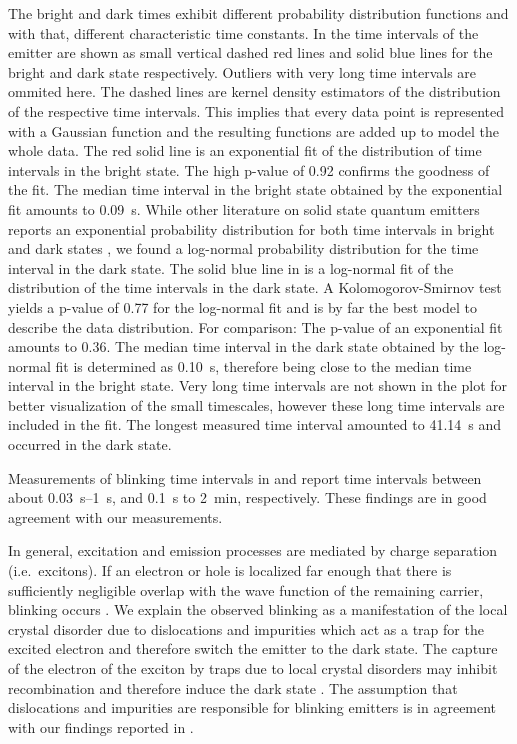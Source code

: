		The bright and dark times exhibit different probability distribution functions and with that, different characteristic time constants.
		In  the time intervals of the emitter are shown as small vertical dashed red lines and solid blue lines for the bright and dark state respectively.
		Outliers with very long time intervals are ommited here.
		The dashed lines are kernel density estimators of the distribution of the respective time intervals.
		This implies that every data point is represented with a Gaussian function and the resulting functions are added up to model the whole data.
		The red solid line is an exponential fit of the distribution of time intervals in the bright state.
		The high p-value of \num{0.92} confirms the goodness of the fit.
		The median time interval in the bright state obtained by the exponential fit amounts to \SI[separate-uncertainty]{0.09}{s}.
		While other literature on solid state quantum emitters reports an exponential probability distribution for both time intervals in bright and dark states \cite{Bradac2010,Berhane2017}, we found a log-normal probability distribution for the time interval in the dark state.
		The solid blue line in  is a log-normal fit of the distribution of the time intervals in the dark state.
		A Kolomogorov-Smirnov test yields a p-value of \num{0.77} for the log-normal fit and is by far the best model to describe the data distribution.
		For comparison: The p-value of an exponential fit amounts to \num{0.36}.
		The median time interval in the dark state obtained by the log-normal fit is determined as \SI{0.10}{s}, therefore being close to the median time interval in the bright state.
		Very long time intervals are not shown in the plot for better visualization of the small timescales, however these long time intervals are included in the fit.
		The longest measured time interval amounted to \SI{41.14}{s} and occurred in the dark state.
		
		Measurements of blinking time intervals in \cite{Jantzen2016} and \cite{Neu2012a} report time intervals between about \SIrange{0.03}{1}{s}, and \SI{0.1}{s} to \SI{2}{min}, respectively.
		These findings are in good agreement with our measurements.
		
		In general, excitation and emission processes are mediated by charge separation (i.e.\ excitons).
		If an electron or hole is localized far enough that there is sufficiently negligible overlap with the wave function of the remaining carrier, blinking occurs \cite{Efros2016}.
		We explain the observed blinking as a manifestation of the local crystal disorder due to dislocations and impurities which act as a trap for the excited electron and therefore switch the emitter to the dark state.
		The capture of the electron of the exciton by traps due to local crystal disorders may inhibit recombination and therefore induce the dark state \cite{Bradac2010}.
		The assumption that dislocations and impurities are responsible for blinking emitters is in agreement with our findings reported in .
		
